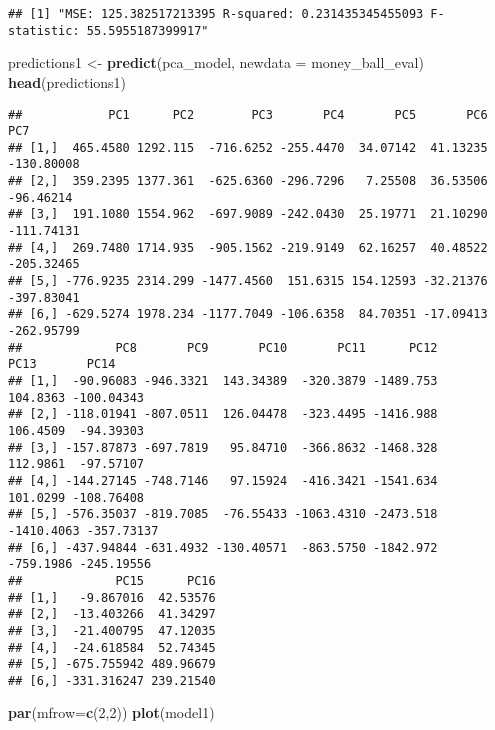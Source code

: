 \documentclass[
]{article}
\newenvironment{Shaded}{\begin{snugshade}}{\end{snugshade}}
\newcommand{\AttributeTok}[1]{\textcolor[rgb]{0.13,0.29,0.53}{#1}}
\newcommand{\DecValTok}[1]{\textcolor[rgb]{0.00,0.00,0.81}{#1}}
\newcommand{\FunctionTok}[1]{\textcolor[rgb]{0.13,0.29,0.53}{\textbf{#1}}}
\newcommand{\NormalTok}[1]{#1}
\newcommand{\OtherTok}[1]{\textcolor[rgb]{0.56,0.35,0.01}{#1}}
\begin{document}
\begin{verbatim}
## [1] "MSE: 125.382517213395 R-squared: 0.231435345455093 F-statistic: 55.5955187399917"
\end{verbatim}

\begin{Shaded}
\begin{Highlighting}[]
\NormalTok{predictions1 }\OtherTok{\textless{}{-}} \FunctionTok{predict}\NormalTok{(pca\_model, }\AttributeTok{newdata =}\NormalTok{ money\_ball\_eval)}
\FunctionTok{head}\NormalTok{(predictions1)}
\end{Highlighting}
\end{Shaded}

\begin{verbatim}
##            PC1      PC2        PC3       PC4       PC5       PC6        PC7
## [1,]  465.4580 1292.115  -716.6252 -255.4470  34.07142  41.13235 -130.80008
## [2,]  359.2395 1377.361  -625.6360 -296.7296   7.25508  36.53506  -96.46214
## [3,]  191.1080 1554.962  -697.9089 -242.0430  25.19771  21.10290 -111.74131
## [4,]  269.7480 1714.935  -905.1562 -219.9149  62.16257  40.48522 -205.32465
## [5,] -776.9235 2314.299 -1477.4560  151.6315 154.12593 -32.21376 -397.83041
## [6,] -629.5274 1978.234 -1177.7049 -106.6358  84.70351 -17.09413 -262.95799
##             PC8       PC9       PC10       PC11      PC12       PC13       PC14
## [1,]  -90.96083 -946.3321  143.34389  -320.3879 -1489.753   104.8363 -100.04343
## [2,] -118.01941 -807.0511  126.04478  -323.4495 -1416.988   106.4509  -94.39303
## [3,] -157.87873 -697.7819   95.84710  -366.8632 -1468.328   112.9861  -97.57107
## [4,] -144.27145 -748.7146   97.15924  -416.3421 -1541.634   101.0299 -108.76408
## [5,] -576.35037 -819.7085  -76.55433 -1063.4310 -2473.518 -1410.4063 -357.73137
## [6,] -437.94844 -631.4932 -130.40571  -863.5750 -1842.972  -759.1986 -245.19556
##             PC15      PC16
## [1,]   -9.867016  42.53576
## [2,]  -13.403266  41.34297
## [3,]  -21.400795  47.12035
## [4,]  -24.618584  52.74345
## [5,] -675.755942 489.96679
## [6,] -331.316247 239.21540
\end{verbatim}

\begin{Shaded}
\begin{Highlighting}[]
\FunctionTok{par}\NormalTok{(}\AttributeTok{mfrow=}\FunctionTok{c}\NormalTok{(}\DecValTok{2}\NormalTok{,}\DecValTok{2}\NormalTok{)) }
\FunctionTok{plot}\NormalTok{(model1)}
\end{Highlighting}
\end{Shaded}
\end{document}
